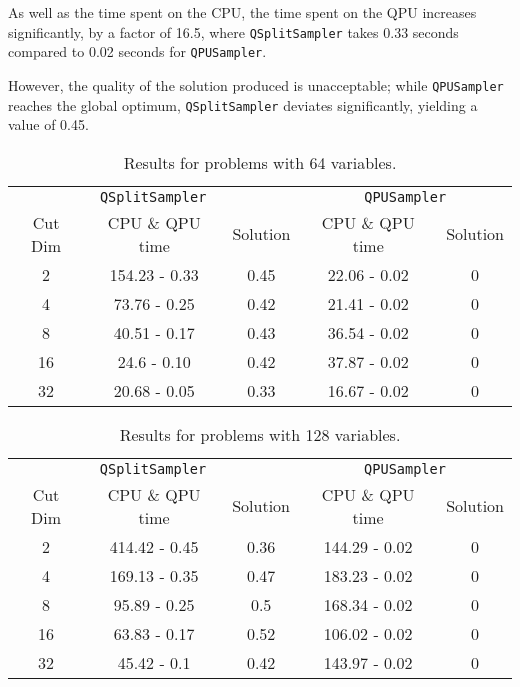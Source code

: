 As well as the time spent on the CPU, the time spent on the QPU increases significantly, by a factor of 16.5, where \texttt{QSplitSampler} takes 0.33 seconds compared to 0.02 seconds for \texttt{QPUSampler}.

However, the quality of the solution produced is unacceptable; while \texttt{QPUSampler} reaches the global optimum, \texttt{QSplitSampler} deviates significantly, yielding a value of 0.45.

\begin{table}[H]
    \centering
    \begin{tabular}{ccc|cc}
        \toprule
        \multicolumn{3}{c}{\texttt{QSplitSampler}} & \multicolumn{2}{c}{\texttt{QPUSampler}} \\
        Cut Dim & CPU \& QPU time & Solution & CPU \& QPU time & Solution \\
        \midrule
        2 & 154.23 - 0.33 & 0.45 & 22.06 - 0.02 & 0 \\
        4 & 73.76 - 0.25 & 0.42 & 21.41 - 0.02 & 0 \\
        8 & 40.51 - 0.17 & 0.43 & 36.54 - 0.02 & 0 \\
        16 & 24.6 - 0.10 & 0.42 & 37.87 - 0.02 & 0 \\
        32 & 20.68 - 0.05 & 0.33 & 16.67 - 0.02 & 0 \\
        \bottomrule
    \end{tabular}
    \caption{Results for problems with 64 variables.}
    \label{tab:64var}
\end{table}

\begin{table}[H]
    \centering
    \begin{tabular}{ccc|cc}
        \toprule
        \multicolumn{3}{c}{\texttt{QSplitSampler}} & \multicolumn{2}{c}{\texttt{QPUSampler}} \\
        Cut Dim & CPU \& QPU time & Solution & CPU \& QPU time & Solution \\
        \midrule
        2 & 414.42 - 0.45 & 0.36 & 144.29 - 0.02 & 0 \\
        4 & 169.13 - 0.35 & 0.47 & 183.23 - 0.02 & 0 \\
        8 & 95.89 - 0.25 & 0.5 & 168.34 - 0.02 & 0 \\
        16 & 63.83 - 0.17 & 0.52 & 106.02 - 0.02 & 0 \\
        32 & 45.42 - 0.1 & 0.42 & 143.97 - 0.02 & 0 \\
        \bottomrule
    \end{tabular}
    \caption{Results for problems with 128 variables.}
    \label{tab:128var}
\end{table}

